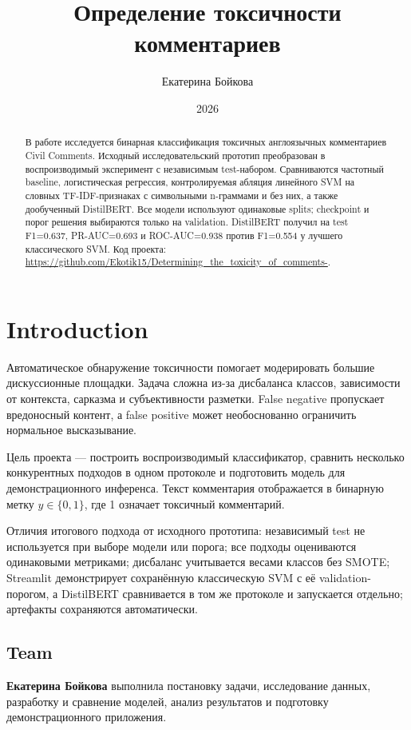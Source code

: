 \documentclass{article}
\title{Определение токсичности комментариев}
\author{Екатерина Бойкова}
\date{2026}
\begin{document}
\maketitle

\begin{abstract}
В работе исследуется бинарная классификация токсичных англоязычных комментариев
Civil Comments. Исходный исследовательский прототип преобразован в воспроизводимый
эксперимент с независимым test-набором. Сравниваются частотный baseline,
логистическая регрессия, контролируемая абляция линейного SVM на словных
TF-IDF-признаках с символьными n-граммами и без них, а также дообученный
DistilBERT. Все модели
используют одинаковые splits; checkpoint и порог решения выбираются только на
validation. DistilBERT получил на test F1=0.637, PR-AUC=0.693 и ROC-AUC=0.938
против F1=0.554 у лучшего классического SVM. Код проекта:
\url{https://github.com/Ekotik15/Determining_the_toxicity_of_comments-}.
\end{abstract}

\section{Introduction}
Автоматическое обнаружение токсичности помогает модерировать большие
дискуссионные площадки. Задача сложна из-за дисбаланса классов, зависимости от
контекста, сарказма и субъективности разметки. False negative пропускает
вредоносный контент, а false positive может необоснованно ограничить нормальное
высказывание.

Цель проекта --- построить воспроизводимый классификатор, сравнить несколько
конкурентных подходов в одном протоколе и подготовить модель для
демонстрационного инференса. Текст комментария отображается в бинарную метку
$y \in \{0, 1\}$, где 1 означает токсичный комментарий.

Отличия итогового подхода от исходного прототипа: независимый test не
используется при выборе модели или порога; все подходы оцениваются одинаковыми
метриками; дисбаланс учитывается весами классов без SMOTE; Streamlit
демонстрирует сохранённую классическую SVM с её validation-порогом, а DistilBERT
сравнивается в том же протоколе и запускается отдельно; артефакты сохраняются
автоматически.

\subsection{Team}
\textbf{Екатерина Бойкова} выполнила постановку задачи, исследование данных,
разработку и сравнение моделей, анализ результатов и подготовку
демонстрационного приложения.
\end{document}
